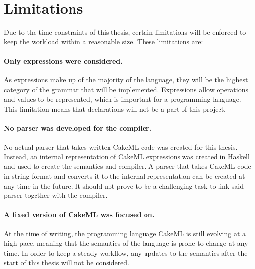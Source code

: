 \section{Limitations}
Due to the time constraints of this thesis, certain limitations will be enforced
to keep the workload within a reasonable size. These limitations are:

\paragraph{Only expressions were considered.}
As expressions make up of the majority of the language, they will be the highest
category of the grammar that will be implemented. Expressions allow operations 
and values to be represented, which is important for a programming language.
This limitation  means that declarations will not be a part of this project.

\paragraph{No parser was developed for the compiler.}
No actual parser that takes written CakeML code was created for this thesis.
Instead, an internal representation of CakeML expressions was created in
Haskell and used to create the semantics and compiler. A parser that
takes CakeML code in string format and converts it to the internal
representation can be created at any time in the future. It should not prove to
be a challenging task to link said parser together with the compiler.

\paragraph{A fixed version of CakeML was focused on.}
At the time of writing, the programming language CakeML is still evolving at a
high pace, meaning that the semantics of the language is prone to change at
any time. In order to keep a steady workflow, any updates to the semantics after
the start of this thesis will not be considered.
